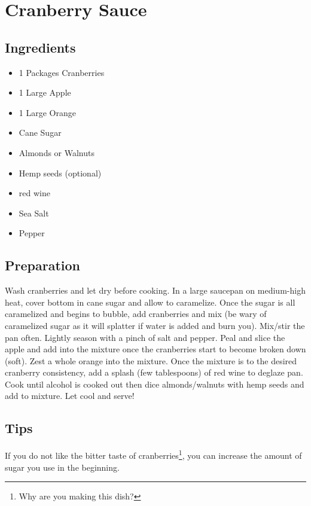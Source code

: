 \thispagestyle{fancy}
\section{Cranberry Sauce} \label{cranberrysauce}
\AddToShipoutPicture*{\CranberrySauce}


\subsection*{Ingredients}

\begin{multicols}{3}
	\begin{itemize}
		\item 1 Packages Cranberries
		\item 1 Large Apple
		\item 1 Large Orange
		\item Cane Sugar
		\item Almonds or Walnuts
		\item Hemp seeds (optional)
		\item red wine
		\item Sea Salt
		\item Pepper
	\end{itemize}
\end{multicols}

\subsection*{Preparation}
	Wash cranberries and let dry before cooking. In a large saucepan on medium-high heat, cover bottom in cane sugar and allow to caramelize. Once the sugar is all caramelized and begins to bubble, add cranberries and mix (be wary of caramelized sugar as it will splatter if water is added and burn you). Mix/stir the pan often. Lightly season with a pinch of salt and pepper. Peal and slice the apple and add into the mixture once the cranberries start to become broken down (soft). Zest a whole orange into the mixture. Once the mixture is to the desired cranberry consistency, add a splash (few tablespoons) of red wine to deglaze pan. Cook until alcohol is cooked out then dice almonds/walnuts with hemp seeds and add to mixture. Let cool and serve! 

\subsection*{Tips}
	If you do not like the bitter taste of cranberries\footnote{Why are you making this dish?}, you can increase the amount of sugar you use in the beginning. 